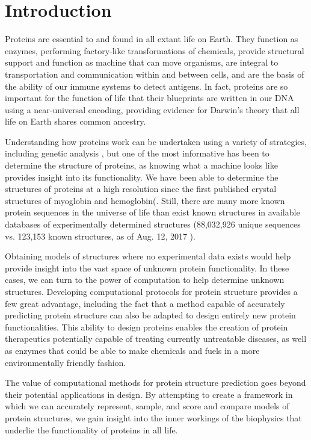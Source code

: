 \chapter{Introduction}

Proteins are essential to and found in all extant life on Earth.
They function as enzymes, performing factory-like transformations of chemicals,
provide structural support and function as machine that can move organisms,
are integral to transportation and communication within and between cells,
and are the basis of the ability of our immune systems to detect antigens.
In fact, proteins are so important for the function of life that their blueprints are written in our DNA\cite{avery_studies_1944} using a near-universal encoding\cite{crick_origin_1968,hinegardner_rationale_1963},
providing evidence for Darwin's theory that all life on Earth shares common ancestry\cite{darwin_origin_1859}.

Understanding how proteins work can be undertaken using a variety of strategies, including genetic analysis \cite{lander_initial_2001}, but one of the most informative has been to determine the structure of proteins, as knowing what a machine looks like provides insight into its functionality.
We have been able to determine the structures of proteins at a high resolution since the first published crystal structures of myoglobin and hemoglobin(\cite{kendrew_three-dimensional_1958,perutz_structure_1960}.
Still, there are many more known protein sequences in the universe of life than exist known structures in available databases of experimentally determined structures (88,032,926 unique sequences vs. 123,153 known structures, as of Aug. 12, 2017 \cite{berman_protein_2000,noauthor_uniprot:_2017}).

Obtaining models of structures where no experimental data exists would help provide insight into the vast space of unknown protein functionality.
In these cases, we can turn to the power of computation to help determine unknown structures.
Developing computational protocols for protein structure provides a few great advantage, including the fact that a method capable of accurately predicting protein structure can also be adapted to design entirely new protein functionalities.
This ability to design proteins enables the creation of protein therapeutics potentially capable of treating currently untreatable diseases, as well as enzymes that could be able to make chemicals and fuels in a more environmentally friendly fashion.

The value of computational methods for protein structure prediction goes beyond their potential applications in design.
By attempting to create a framework in which we can accurately represent, sample, and score and compare models of protein structures, we gain insight into the inner workings of the biophysics that underlie the functionality of proteins in all life.

